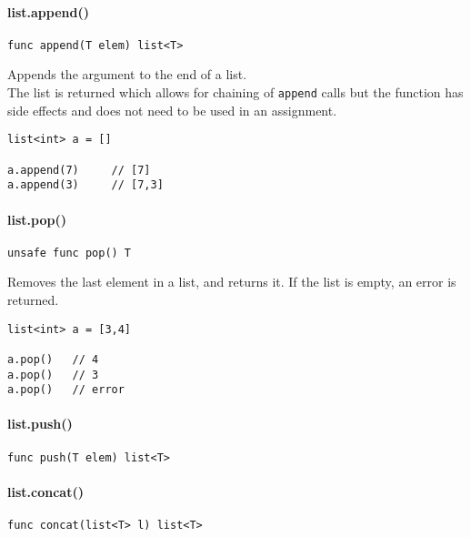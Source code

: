 \documentclass[]{article}
\begin{document}
\paragraph{list.append()}\label{list.append}

\begin{verbatim}
func append(T elem) list<T>
\end{verbatim}

Appends the argument to the end of a list.\\The list is returned which
allows for chaining of \texttt{append} calls but the function has side
effects and does not need to be used in an assignment.

\begin{verbatim}
list<int> a = []

a.append(7)     // [7]
a.append(3)     // [7,3]
\end{verbatim}

\paragraph{list.pop()}\label{list.pop}

\begin{verbatim}
unsafe func pop() T
\end{verbatim}

Removes the last element in a list, and returns it. If the list is
empty, an error is returned.

\begin{verbatim}
list<int> a = [3,4]

a.pop()   // 4
a.pop()   // 3
a.pop()   // error
\end{verbatim}

\paragraph{list.push()}\label{list.push}

\begin{verbatim}
func push(T elem) list<T>
\end{verbatim}

\paragraph{list.concat()}\label{list.concat}

\begin{verbatim}
func concat(list<T> l) list<T>
\end{verbatim}
\end{document}
